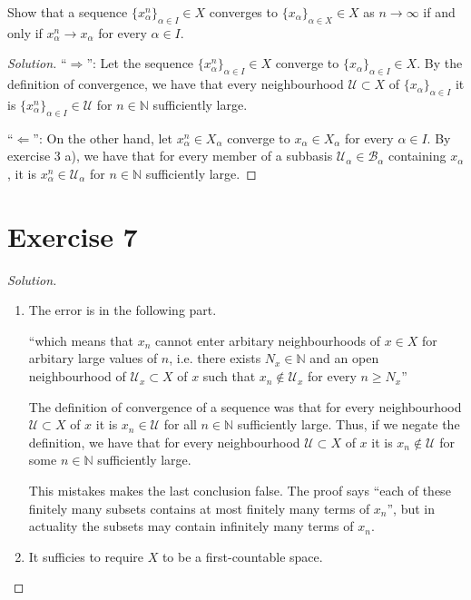 \documentclass[a4paper]{article}
\theoremstyle{definition}
\begin{document}
Show that a sequence \(\{x_\alpha^n\}_{\alpha \in I} \in X\) converges to \(\{x_\alpha\}_{\alpha \in X} \in X\) as \(n \longrightarrow \infty\) if and only if \(x^n_\alpha \longrightarrow x_\alpha\) for every \(\alpha \in I\).

\begin{proof}[Solution]
    ``\(\Rightarrow\)'': Let the sequence \(\{x_\alpha^n\}_{\alpha \in I} \in X\) converge to \(\{x_\alpha\}_{\alpha \in I} \in X\). By the definition of convergence, we have that every neighbourhood \(\mathcal{U} \subset X\) of \(\{x_\alpha\}_{\alpha \in I}\) it is \(\{x_\alpha^n\}_{\alpha \in I} \in \mathcal{U}\) for \(n \in \mathbb{N}\) sufficiently large.

    ``\(\Leftarrow\)'': On the other hand, let \(x^n_\alpha \in X_\alpha\) converge to \(x_\alpha \in X_\alpha\) for every \(\alpha \in I\). By exercise 3 a), we have that for every member of a subbasis \(\mathcal{U}_\alpha \in \mathcal{B}_\alpha\) containing \(x_\alpha\), it is \(x_\alpha^n \in \mathcal{U}_\alpha\) for \(n \in \mathbb{N}\) sufficiently large.
\end{proof}

\section*{Exercise 7}

\begin{proof}[Solution]
    \begin{enumerate}
        \item The error is in the following part.
    
        ``which means that \(x_n\) {\color{red}cannot enter} arbitary neighbourhoods of \(x \in X\) for arbitary large values of \(n\), i.e. there exists \(N_x \in \mathbb{N}\) and an open neighbourhood of \(\mathcal{U}_x \subset X\) of \(x\) such that \(x_n \not\in \mathcal{U}_x\) {\color{red}for every} \(n \geq N_x\)''
    
        The definition of convergence of a sequence was that for every neighbourhood \(\mathcal{U} \subset X\) of \(x\) it is \(x_n \in \mathcal{U}\) for all \(n \in \mathbb{N}\) sufficiently large. Thus, if we negate the definition, we have that for every neighbourhood \(\mathcal{U} \subset X\) of \(x\) it is \(x_n \not\in \mathcal{U}\) {\color{red}for some} \(n \in \mathbb{N}\) sufficiently large.
    
        This mistakes makes the last conclusion false. The proof says ``each of these finitely many subsets contains at most finitely many terms of \(x_n\)'', but in actuality the subsets may contain infinitely many terms of \(x_n\).
        \item It sufficies to require \(X\) to be a first-countable space.
    \end{enumerate}
\end{proof}
\end{document}

